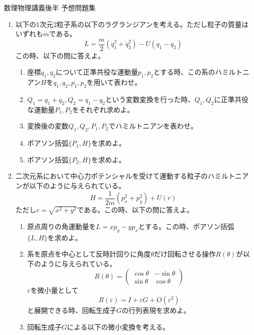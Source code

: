 \documentclass{jsarticle}
\begin{document}
\begin{center}
  {\huge 数理物理講義後半 予想問題集}\\
\end{center}

\begin{enumerate}
  \item 以下の1次元2粒子系の以下のラグランジアンを考える。ただし粒子の質量はいずれも$m$である。
        $$
          L = \frac{m}{2}(\dot{q}_1^2+\dot{q}_2^2) - U(q_1-q_2)
        $$
        この時、以下の問に答えよ。
        \begin{enumerate}
          \item 座標$q_1, q_2$について正準共役な運動量$p_1, p_2$とする時、この系のハミルトニアン$H$を$q_1, q_2, p_1, p_2$を用いて表わせ。
          \item $Q_1 = q_1 + q_2, Q_2 = q_1 - q_2$という変数変換を行った時、$Q_1, Q_2$に正準共役な運動量$P_1, P_2$をそれぞれ求めよ。
          \item 変換後の変数$Q_1, Q_2, P_1, P_2$でハミルトニアンを表わせ。
          \item ポアソン括弧$\{P_1, H\}$を求めよ。
          \item ポアソン括弧$\{P_2, H\}$を求めよ。
        \end{enumerate}
  \item 二次元系において中心力ポテンシャルを受けて運動する粒子のハミルトニアンが以下のように与えられている。
        $$
          H=\frac{1}{2m}(p_x^2 + p_y^2) + U(r)
        $$
        ただし$r = \sqrt{x^2+y^2}$である。この時、以下の問に答えよ。
        \begin{enumerate}
          \item 原点周りの角運動量を$L = x p_y - y p_x$とする。この時、ポアソン括弧$\{L, H\}$を求めよ。
          \item 系を原点を中心として反時計回りに角度$\theta$だけ回転させる操作$R(\theta)$が以下のように与えられている。
                $$
                  R(\theta) = \begin{pmatrix}
                    \cos \theta & -\sin \theta \\
                    \sin \theta & \cos \theta
                  \end{pmatrix}
                $$
                $\varepsilon$を微小量として
                $$
                  R(\varepsilon) = I + \varepsilon G + O(\varepsilon^2)
                $$
                と展開できる時、回転生成子$G$の行列表現を求めよ。
          \item 回転生成子$G$による以下の微小変換を考える。

\end{enumerate}
\end{enumerate}
\end{document}
